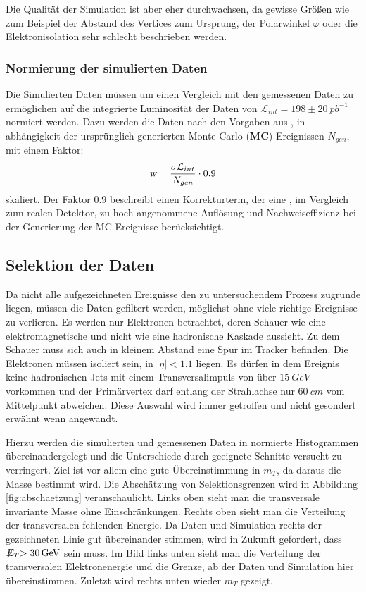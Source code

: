 \documentclass[a4paper,12pt]{article}
\newcommand{\met}{\ensuremath{\not\mathrel{E}}_T}
\begin{document}
Die Qualität der Simulation ist aber eher durchwachsen, da gewisse Größen wie zum Beispiel der
Abstand des Vertices zum Ursprung, der Polarwinkel $φ$ oder die Elektronisolation sehr schlecht
beschrieben werden.

\subsubsection*{Normierung der simulierten Daten}
Die Simulierten Daten müssen um einen Vergleich mit den gemessenen Daten zu ermöglichen auf die 
integrierte Luminosität der Daten von $\mathcal{L}_{int}=198 \pm \SI{20}{pb^{-1}}$ normiert werden. 
Dazu werden die Daten nach den Vorgaben aus \cite{versuchsanleitung},
in abhängigkeit der ursprünglich generierten Monte Carlo (\textbf{MC}) Ereignissen $N_{gen}$, mit einem Faktor:
\begin{align*}
	\textsl{w}= \frac{\sigma \mathcal{L}_{int}}{N_{gen}} \cdot 0.9
\end{align*}
skaliert. Der Faktor $0.9$ beschreibt einen Korrekturterm, der eine , im Vergleich zum realen Detektor,
zu hoch angenommene Auflösung und Nachweiseffizienz bei der Generierung der MC Ereignisse berücksichtigt.

\subsection{Selektion der Daten}
Da nicht alle aufgezeichneten Ereignisse den zu untersuchendem Prozess zugrunde liegen, müssen die
Daten gefiltert werden, möglichst ohne viele richtige Ereignisse zu verlieren. Es werden nur
Elektronen betrachtet, deren Schauer wie eine elektromagnetische und nicht wie eine hadronische
Kaskade aussieht. Zu dem Schauer muss sich auch in kleinem Abstand eine Spur im Tracker befinden.
Die Elektronen müssen isoliert sein, in $|\eta| < 1.1$ liegen. Es dürfen in dem Ereignis keine
hadronischen Jets mit einem Transversalimpuls von über $\SI{15}{GeV}$ vorkommen und der Primärvertex
darf entlang der Strahlachse nur $\SI{60}{cm}$ vom Mittelpunkt abweichen. Diese Auswahl wird immer
getroffen und nicht gesondert erwähnt wenn angewandt.

Hierzu werden die simulierten und gemessenen Daten in normierte Histogrammen übereinandergelegt
und die Unterschiede durch geeignete Schnitte versucht zu verringert. Ziel ist vor allem eine gute
Übereinstimmung in $m_T$, da daraus die Masse bestimmt wird. Die Abschätzung von Selektionsgrenzen
wird in Abbildung \ref{fig:abschaetzung} veranschaulicht. Links oben sieht man die transversale
invariante Masse ohne Einschränkungen. Rechts oben sieht man die Verteilung der transversalen
fehlenden Energie. Da Daten und Simulation rechts der gezeichneten Linie gut übereinander stimmen,
wird in Zukunft gefordert, dass $\met > \SI{30}{GeV}$ sein muss. Im Bild links unten sieht man die
Verteilung der transversalen Elektronenergie und die Grenze, ab der Daten und Simulation hier
übereinstimmen. Zuletzt wird rechts unten wieder $m_T$ gezeigt.
\end{document}
